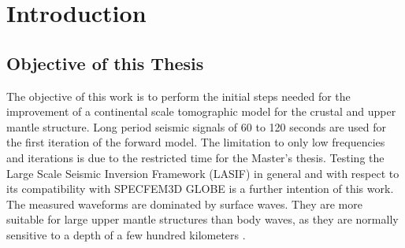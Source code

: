 

\chapter{Introduction}

\section{Objective of this Thesis} %

The objective of this work is to perform the initial steps needed for the improvement of a continental scale tomographic model for the crustal and upper mantle structure.
Long period seismic signals of 60 to 120 seconds %
are used for the first iteration of the forward model. 
The limitation to only low frequencies and %
iterations is due to the restricted time for the Master's thesis.
Testing the Large Scale Seismic Inversion Framework (LASIF) in general and with respect to its compatibility with SPECFEM3D 
GLOBE is a further intention of this work.
The measured waveforms are dominated by surface waves. 
They are more suitable for large upper mantle structures than body waves, as they are normally sensitive to a depth of a few 
hundred kilometers \citep{Morelli2004}.

